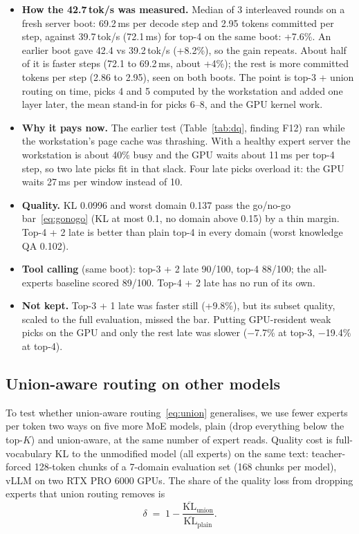 \documentclass[11pt]{article}
\newcommand{\tps}{\,tok/s}
\newcommand{\ms}{\,ms}
\newcommand{\KL}{\mathrm{KL}}
\begin{document}
\begin{itemize}
  \item \textbf{How the 42.7\tps{} was measured.} Median of 3 interleaved rounds on a fresh server boot: 69.2\ms{} per
    decode step and 2.95 tokens committed per step, against 39.7\tps{} (72.1\ms) for top-4 on the same boot: +7.6\%.
    An earlier boot gave 42.4 vs 39.2\tps{} (+8.2\%), so the gain repeats. About half of it is faster steps (72.1 to
    69.2\ms, about +4\%); the rest is more committed tokens per step (2.86 to 2.95), seen on both boots. The point is
    top-3 + union routing on time, picks 4 and 5 computed by the workstation and added one layer later, the mean
    stand-in for picks 6--8, and the GPU kernel work.
  \item \textbf{Why it pays now.} The earlier test (Table~\ref{tab:dq}, finding F12) ran while the workstation's page
    cache was thrashing. With a healthy expert server the workstation is about 40\% busy and the GPU waits about 11\ms{}
    per top-4 step, so two late picks fit in that slack. Four late picks overload it: the GPU waits 27\ms{} per window
    instead of 10.
  \item \textbf{Quality.} KL 0.0996 and worst domain 0.137 pass the go/no-go bar~\eqref{eq:gonogo} (KL at most 0.1, no
    domain above 0.15) by a thin margin. Top-4 + 2 late is better than plain top-4 in every domain (worst knowledge QA
    0.102).
  \item \textbf{Tool calling} (same boot): top-3 + 2 late 90/100, top-4 88/100; the all-experts baseline scored 89/100.
    Top-4 + 2 late has no run of its own.
  \item \textbf{Not kept.} Top-3 + 1 late was faster still (+9.8\%), but its subset quality, scaled to the full
    evaluation, missed the bar. Putting GPU-resident weak picks on the GPU and only the rest late was slower ($-$7.7\% at
    top-3, $-$19.4\% at top-4).
\end{itemize}

\FloatBarrier
\subsection{Union-aware routing on other models}
\label{sec:res-union}
To test whether union-aware routing~\eqref{eq:union} generalises, we use fewer experts per token two ways on five more
MoE models, plain (drop everything below the top-$K$) and union-aware, at the same number of expert reads. Quality cost
is full-vocabulary KL to the unmodified model (all experts) on the same text: teacher-forced 128-token chunks of a
7-domain evaluation set (168 chunks per model), vLLM on two RTX PRO 6000 GPUs. The share of the quality loss from
dropping experts that union routing removes is
\begin{equation}
  \delta \;=\; 1 - \frac{\overline{\KL}_{\text{union}}}{\overline{\KL}_{\text{plain}}} .
  \label{eq:lessdamage}
\end{equation}
\end{document}
